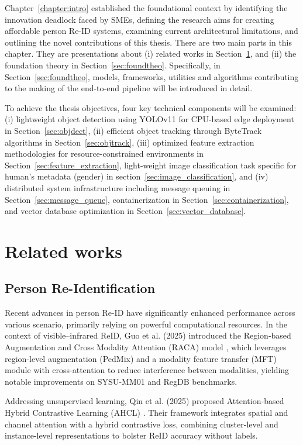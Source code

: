 \documentclass[../main.tex]{subfiles}
\begin{document}
Chapter~\ref{chapter:intro} established the foundational context by identifying the innovation deadlock faced by SMEs, defining the research aims for creating affordable person Re-ID systems, examining current architectural limitations, and outlining the novel contributions of this thesis. There are two main parts in this chapter. They are presentations about (i) related works in Section~\ref{sec:related}, and (ii) the foundation theory in Section~\ref{sec:foundtheo}. Specifically, in Section~\ref{sec:foundtheo}, models, frameworks, utilities and algorithms contributing to the making of the end-to-end pipeline will be introduced in detail. 

To achieve the thesis objectives, four key technical components will be examined: (i) lightweight object detection using YOLOv11 for CPU-based edge deployment in Section~\ref{sec:objdect}, (ii) efficient object tracking through ByteTrack algorithms in Section~\ref{sec:objtrack}, (iii) optimized feature extraction methodologies for resource-constrained environments in Section~\ref{sec:feature_extraction}, light-weight image classification task specific for human's metadata (gender) in section~\ref{sec:image_classification}, and (iv) distributed system infrastructure including message queuing in Section~\ref{sec:message_queue}, containerization in Section~\ref{sec:containerization}, and vector database optimization in Section~\ref{sec:vector_database}.

\section{Related works}
\label{sec:related}

\subsection{Person Re-Identification}
\label{sec:personreid}

Recent advances in person Re-ID have significantly enhanced performance across various scenario, primarily relying on powerful computational resources. In the context of visible–infrared ReID, Guo et al. (2025) introduced the Region‑based Augmentation and Cross Modality Attention (RACA) model \cite{visible-infrared-reid}, which leverages region-level augmentation (PedMix) and a modality feature transfer (MFT) module with cross-attention to reduce interference between modalities, yielding notable improvements on SYSU‑MM01 and RegDB benchmarks.

Addressing unsupervised learning, Qin et al. (2025) proposed Attention‑based Hybrid Contrastive Learning (AHCL) \cite{unsupervised-reid}. Their framework integrates spatial and channel attention with a hybrid contrastive loss, combining cluster-level and instance-level representations to bolster ReID accuracy without labels.
\end{document}
